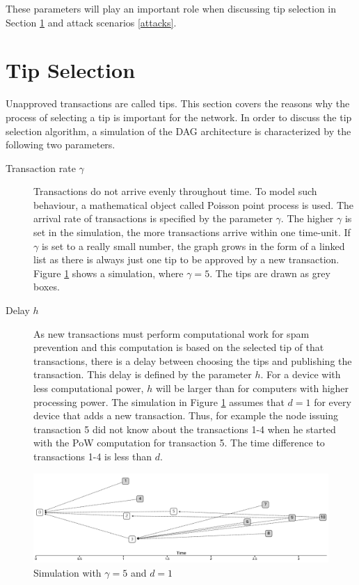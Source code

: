 These parameters will play an important role when discussing tip selection in Section \ref{tip-selection} and attack scenarios \ref{attacks}.

\section{Tip Selection}\label{tip-selection}
Unapproved transactions are called tips. This section covers the reasons why the process of selecting a tip is important for the network.
In order to discuss the tip selection algorithm, a simulation of the DAG architecture is characterized by the following two parameters. 


\begin{description}
    \item[Transaction rate $\gamma$] Transactions do not arrive evenly throughout time. To model such behaviour, a mathematical object called Poisson point process is used. The arrival rate of transactions is specified by the parameter $\gamma$. The higher $\gamma$ is set in the simulation, the more transactions arrive within one time-unit. If $\gamma$ is set to a really small number, the graph grows in the form of a linked list as there is always just one tip to be approved by a new transaction. Figure \ref{fig:simulation} shows a simulation, where $\gamma=5$. The tips are drawn as grey boxes.
    \item[Delay $h$] As new transactions must perform computational work for spam prevention and this computation is based on the selected tip of that transactions, there is a delay between choosing the tips and publishing the transaction. This delay is defined by the parameter $h$. For a device with less computational power, $h$ will be larger than for computers with higher processing power. The simulation in Figure \ref{fig:simulation} assumes that $d=1$ for every device that adds a new transaction. Thus, for example the node issuing transaction 5 did not know about the transactions 1-4 when he started with the PoW computation for transaction 5. The time difference to transactions 1-4 is less than $d$. 
\end{description}

\begin{figure}[H]
    \centering
    \includegraphics[width=1.0\textwidth]{images/simulation.png}
    \caption{Simulation with $\gamma=5$ and $d=1$  \cite{the-tangle-part-3}}
    \label{fig:simulation}
\end{figure}


